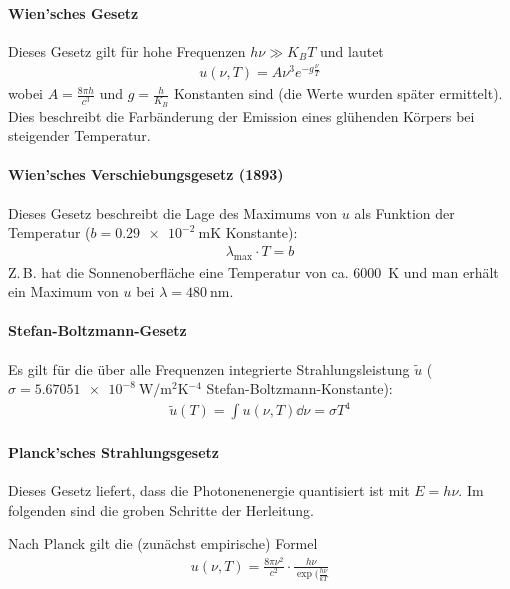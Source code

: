 \paragraph{Wien'sches Gesetz}
Dieses Gesetz gilt für hohe Frequenzen $h\nu\gg K_BT$ 
und lautet
\begin{gather*}
  u(\nu, T) = A\nu^3e^{-g\frac{\nu}{T}}
\end{gather*}
wobei $A=\frac{8\pi h}{c^3}$ und $g=\frac{h}{K_B}$ Konstanten sind
(die Werte wurden später ermittelt).
Dies beschreibt die Farbänderung der Emission eines glühenden Körpers bei
steigender Temperatur.

\paragraph{Wien'sches Verschiebungsgesetz (1893)}
Dieses Gesetz beschreibt die Lage des Maximums von $u$ als Funktion
der Temperatur
($b=\SI{0.29e-2}{\meter\kelvin}$%
Konstante):
\begin{gather*}
  \lambda_\text{max}\cdot T = b
\end{gather*}
Z.\,B. hat die Sonnenoberfläche eine Temperatur von
ca. \SI{6000}{\kelvin} und man erhält ein Maximum von $u$ bei
$\lambda=\SI{480}{\nano\meter}$.

\paragraph{Stefan-Boltzmann-Gesetz}
Es gilt für die über alle Frequenzen integrierte Strahlungsleistung
$\widetilde u$
($\sigma = \SI{5.67051e-8}{\watt\per\square\meter\kelvin^{-4}}$%
Stefan-Boltzmann-Konstante):
\begin{gather*}
  \widetilde u(T) = \int u(\nu,T)\dd\nu = \sigma T^4
\end{gather*}

\paragraph{Planck'sches Strahlungsgesetz}
Dieses Gesetz liefert, dass die Photonenenergie quantisiert ist mit
$E=h\nu$. Im folgenden sind die groben Schritte der Herleitung.

Nach Planck gilt die (zunächst empirische) Formel
\begin{gather}
  u(\nu, T) 
  = \frac{8\pi\nu^2}{c^2}
  \cdot \frac{h\nu}{\exp(\frac{h\nu}{kT}}
  \label{planck}
\end{gather}

